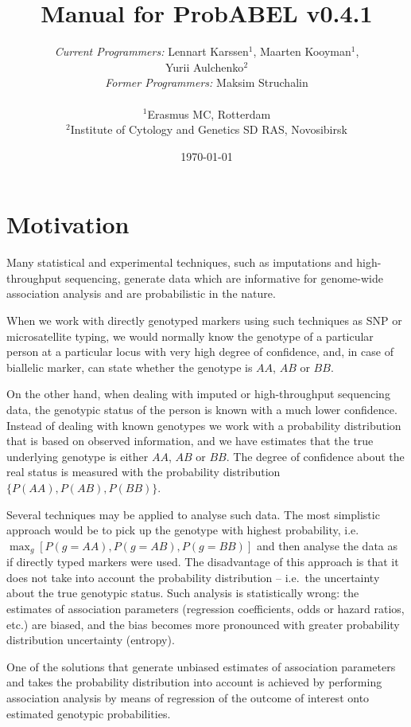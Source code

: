 \documentclass[12pt,a4paper]{article}
\title{Manual for ProbABEL v0.4.1}
\author{\emph{Current Programmers:} Lennart Karssen$^{1}$, Maarten
  Kooyman$^1$, \\
  Yurii Aulchenko$^{2}$ \\
  \emph{Former Programmers:} Maksim Struchalin
  \\
  \\
  $^{1}${\small Erasmus MC, Rotterdam} \\
  $^{2}${\small Institute of Cytology and Genetics SD RAS, Novosibirsk}
}
\date{\today}
\begin{document}
\maketitle
\tableofcontents


\section{Motivation}

Many statistical and experimental techniques, such as imputations and
high-throughput sequencing, generate data which are informative for
genome-wide association analysis and are probabilistic in the nature.

When we work with directly genotyped markers using such techniques as
SNP or microsatellite typing, we would normally know the genotype of
a particular person at a particular locus with very high degree of
confidence, and, in case of biallelic marker, can state whether
the genotype is $AA$, $AB$ or $BB$.

On the other hand, when dealing with imputed or high-throughput
sequencing data, the genotypic status of the person is known with a
much lower confidence. Instead of dealing with
known genotypes we work with a probability distribution that is based
on observed information, and we have estimates that the true underlying
genotype is either $AA$, $AB$ or $BB$. The degree of confidence about
the real status is measured with the probability distribution
$\{P(AA), P(AB), P(BB)\}$.

Several techniques may be applied to analyse such data. The most
simplistic approach would be to pick up the genotype with highest
probability, i.e.~$\max_g[P(g=AA), P(g=AB), P(g=BB)]$ and then
analyse the data as if directly typed markers were used. The
disadvantage of this approach is that it does not take into
account the probability distribution -- i.e.~the uncertainty
about the true genotypic status. Such
analysis is statistically wrong: the estimates of association
parameters (regression coefficients, odds or hazard ratios, etc.)
are biased, and the bias becomes more pronounced with greater
probability distribution uncertainty (entropy).

One of the solutions that generate unbiased estimates
of association parameters and takes the
probability distribution into account is achieved by
performing association analysis by means of regression of the
outcome of interest onto estimated genotypic probabilities.
\end{document}
